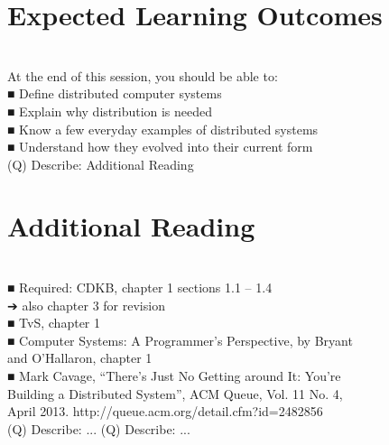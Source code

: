 \documentclass[12pt]{article}
\begin{document}
\section{Expected Learning Outcomes}
\\
At the end of this session, you should be able to:\\
■ Define distributed computer systems\\
■ Explain why distribution is needed\\
■ Know a few everyday examples of distributed systems\\
■ Understand how they evolved into their current form\\
\clearpage
(Q)
Describe: Additional Reading
\clearpage
\section{Additional Reading}
\\
■ Required: CDKB, chapter 1 sections 1.1 -- 1.4\\
➔ also chapter 3 for revision\\
■ TvS, chapter 1\\
■ Computer Systems: A Programmer's Perspective, by Bryant \\
and O'Hallaron, chapter 1\\
■ Mark Cavage, “There's Just No Getting around It: You're \\
Building a Distributed System”, ACM Queue, Vol. 11 No. 4, \\
April 2013. http://queue.acm.org/detail.cfm?id=2482856\\
\clearpage
(Q)
Describe: ...
\clearpage
\clearpage
(Q)
Describe: ...
\clearpage
\\
\end{document}
